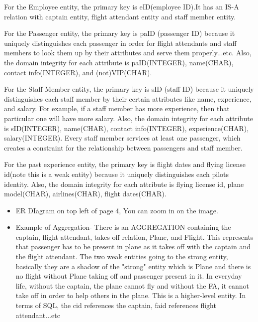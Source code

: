 \documentclass[10pt,conference]{IEEEtran}
\begin{document}
\textnormal{For the Employee entity, the primary key is eID(employee ID).It has an IS-A relation with captain entity, flight attendant entity and staff member entity.}
\vspace{3mm}

\textnormal{For the Passenger entity, the primary key is paID (passenger ID) because it uniquely distinguishes each passenger in order for flight attendants and staff members to look them up by their attributes and serve them properly...etc. Also, the domain integrity for each attribute is paID(INTEGER), name(CHAR), contact info(INTEGER), and (not)VIP(CHAR).}
\vspace{3mm}

\textnormal{For the Staff Member entity, the primary key is sID (staff ID) because it uniquely distinguishes each staff member by their certain attributes like name, experience, and salary. For example, if a staff member has more experience, then that particular one will have more salary. Also, the domain integrity for each attribute is sID(INTEGER), name(CHAR), contact info(INTEGER), experience(CHAR), salary(INTEGER). Every staff member services at least one passenger, which creates a constraint for the relationship between passengers and staff member.}

\textnormal{For the past experience entity, the primary key is flight dates and flying license id(note this is a weak entity) because it uniquely distinguishes each pilots identity. Also, the domain integrity for each attribute is flying license id, plane model(CHAR), airlines(CHAR), flight dates(CHAR).}

\begin{itemize} \item{
ER DIagram on top left of page 4, You can zoom in on the image.} \end{itemize}



\vspace{150mm}


\begin{itemize} \item{
Example of Aggregation- There is an AGGREGATION containing the captain, flight attendant, takes off relation, Plane, and Flight.  This represents that passenger has to be present in plane as it takes off with the captain and the flight attendant. The two weak entities going to the strong entity, basically they are a shadow of the "strong" entity which is Plane and there is no flight without Plane taking off and passenger present in it. In everyday life, without the captain, the plane cannot fly and without the FA, it cannot take off in order to help others in the plane. This is a higher-level entity. In terms of SQL, the cid references the captain, faid references flight attendant...etc} \end{itemize}
\end{document}
